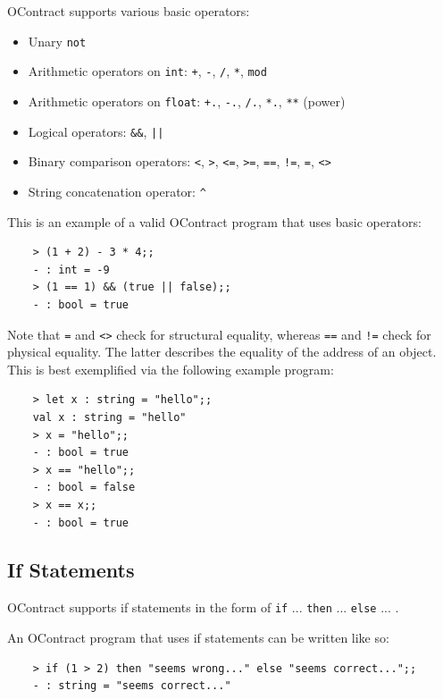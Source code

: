\documentclass[a4paper]{article}
\begin{document}
OContract supports various basic operators:

\begin{itemize}
    \item Unary \texttt{not}
    \item Arithmetic operators on \texttt{int}: \texttt{+}, \texttt{-}, \texttt{/}, \texttt{*}, \texttt{mod}
    \item Arithmetic operators on \texttt{float}: \texttt{+.}, \texttt{-.}, \texttt{/.}, \texttt{*.}, \texttt{**} (power)
    \item Logical operators: \texttt{\&\&}, \texttt{||}
    \item Binary comparison operators: \texttt{<}, \texttt{>}, \texttt{<=}, \texttt{>=}, \texttt{==}, \texttt{!=}, \texttt{=}, \texttt{<>}
    \item String concatenation operator: \texttt{\^}
  \end{itemize}

This is an example of a valid OContract program that uses basic operators:

\begin{verbatim}
    > (1 + 2) - 3 * 4;;
    - : int = -9
    > (1 == 1) && (true || false);;
    - : bool = true
\end{verbatim}

Note that \texttt{=} and \texttt{<>} check for structural equality, whereas \texttt{==} and \texttt{!=} check for physical equality.
The latter describes the equality of the address of an object.
This is best exemplified via the following example program:

\begin{verbatim}
    > let x : string = "hello";;
    val x : string = "hello"
    > x = "hello";;
    - : bool = true
    > x == "hello";;
    - : bool = false
    > x == x;;
    - : bool = true
\end{verbatim}

\subsection{If Statements}

OContract supports if statements in the form of \texttt{if} ... \texttt{then} ... \texttt{else} ... .

An OContract program that uses if statements can be written like so:

\begin{verbatim}
    > if (1 > 2) then "seems wrong..." else "seems correct...";;
    - : string = "seems correct..."
\end{verbatim}
\end{document}
